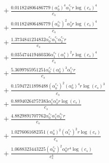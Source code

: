 \documentclass[10pt]{article}
\begin{document}
\begin{align*}
&{}  + \frac{0.011824806486779 \left(\alpha_{0}^s\right)^{4} \alpha_{1}^{c_s} r \log{\left(c_{s} \right)}^{4}}{c_{s}} \\
&{}  + \frac{0.011824806486779 \left(\alpha_{0}^{c_s}\right)^{2} \alpha_{3}^s r \log{\left(c_{s} \right)}^{4}}{c_{s}} \\
&{}  + \frac{1.3734841234832 \alpha_{0}^{c_s} \alpha_{1}^{c_s} \alpha_{2}^{c_s} r}{c_{s}} \\
&{}  + \frac{0.035474419460336 \alpha_{1}^{c_s} \left(\alpha_{1}^s\right)^{2} r \log{\left(c_{s} \right)}^{4}}{c_{s}} \\
&{}  + \frac{5.3699765951251 \alpha_{0}^{c_s} \left(\alpha_{0}^s\right)^{3} \alpha_{1}^{c_s} r}{c_{s}} \\
&{}  + \frac{0.15947211898488 \left(\alpha_{0}^{c_s}\right)^{2} \left(\alpha_{0}^s\right)^{4} r \log{\left(c_{s} \right)}^{3}}{c_{s}} \\
&{}  + \frac{0.88940264757383 \alpha_{1}^s \alpha_{3}^s r \log{\left(c_{s} \right)}}{c_{s}} \\
&{}  + \frac{4.8829891707762 \alpha_{0}^{c_s} \alpha_{1}^s \alpha_{2}^{c_s} r}{c_{s}} \\
&{}  + \frac{1.0276061682351 \left(\alpha_{0}^s\right)^{2} \left(\alpha_{1}^{c_s}\right)^{2} r \log{\left(c_{s} \right)}}{c_{s}} \\
&{}  + \frac{1.0688323443225 \left(\alpha_{0}^{c_s}\right)^{2} \alpha_{0}^s r^{4} \log{\left(c_{s} \right)}}{c_{s}^{4}}
\end{align*}
\end{document}
